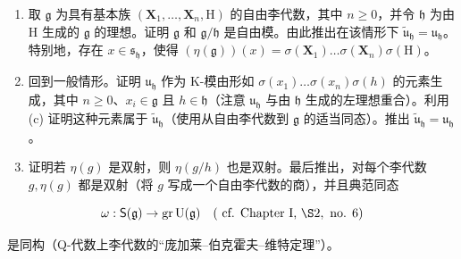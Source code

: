 \begin{enumerate}
\def\labelenumi{(\alph{enumi})}
\setcounter{enumi}{2}
\item
  取 \(\mathfrak{g}\) 为具有基本族 \((\mathbf{X}_1, \ldots, \mathbf{X}_n, \mathrm{H})\) 的自由李代数，其中 \(n \geqslant 0\)，并令 \(\mathfrak{h}\) 为由 H 生成的 \(\mathfrak{g}\) 的理想。证明 \(\mathfrak{g}\) 和 \(\mathfrak{g} / \mathfrak{h}\) 是自由模。由此推出在该情形下 \(\tilde{\mathfrak{u}}_{\mathfrak{h}} = \mathfrak{u}_{\mathfrak{h}}\)。特别地，存在 \(x \in \mathfrak{s}_{\mathfrak{h}}\)，使得 \((\eta(\mathfrak{g}))(x) = \sigma(\mathbf{X}_1) \ldots \sigma(\mathbf{X}_n) \sigma(\mathrm{H})\)。
\item
  回到一般情形。证明 \(\mathfrak{u}_{\mathfrak{h}}\) 作为 \(\mathrm{K}\)-模由形如 \(\sigma(x_1) \ldots \sigma(x_n)\sigma(h)\) 的元素生成，其中 \(n \geqslant 0\)、\(x_i \in \mathfrak{g}\) 且 \(h \in \mathfrak{h}\)（注意 \(\mathfrak{u}_{\mathfrak{h}}\) 与由 \(\mathfrak{h}\) 生成的左理想重合）。利用 (c) 证明这种元素属于 \(\tilde{\mathfrak{u}}_{\mathfrak{h}}\)（使用从自由李代数到 \(\mathfrak{g}\) 的适当同态）。推出 \(\tilde{\mathfrak{u}}_{\mathfrak{h}} = \mathfrak{u}_{\mathfrak{h}}\)。
\item
  证明若 \(\eta(g)\) 是双射，则 \(\eta(g/h)\) 也是双射。最后推出，对每个李代数 \(g, \eta(g)\) 都是双射（将 \(g\) 写成一个自由李代数的商），并且典范同态
\end{enumerate}

\[
\omega : \mathsf {S} (\mathfrak {g}) \to \operatorname{gr} \mathrm{U} (\mathfrak {g}) \quad (\text { cf.   Chapter   I,   } \S 2, \text {   no.   } 6)
\]

是同构（Q-代数上李代数的“庞加莱–伯克霍夫–维特定理”）。

